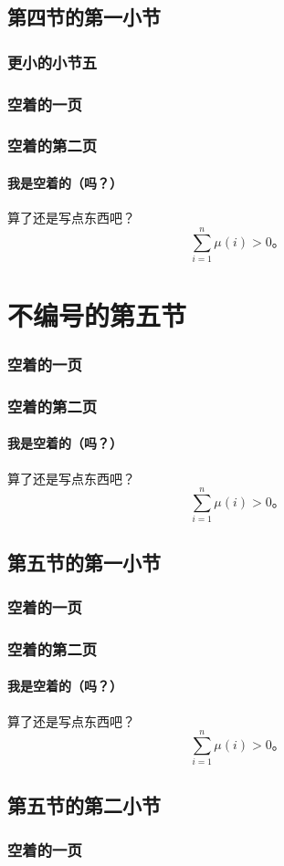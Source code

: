 \documentclass{../pkslide}
\begin{document}
\subsection{第四节的第一小节}
\subsubsection{更小的小节五}

\begin{frame}
  \frametitle{空着的一页}
\end{frame}

\begin{frame}
  \frametitle{空着的第二页}
  \framesubtitle{我是空着的（吗？）}
  算了还是写点东西吧？
  \[ \sum_{i = 1}^{n} \mu(i) > 0 \text{。} \]
\end{frame}

\section*{不编号的第五节}

\begin{frame}
  \frametitle{空着的一页}
\end{frame}

\begin{frame}
  \frametitle{空着的第二页}
  \framesubtitle{我是空着的（吗？）}
  算了还是写点东西吧？
  \[ \sum_{i = 1}^{n} \mu(i) > 0 \text{。} \]
\end{frame}

\subsection{第五节的第一小节}

\begin{frame}
  \frametitle{空着的一页}
\end{frame}

\begin{frame}
  \frametitle{空着的第二页}
  \framesubtitle{我是空着的（吗？）}
  算了还是写点东西吧？
  \[ \sum_{i = 1}^{n} \mu(i) > 0 \text{。} \]
\end{frame}

\subsection{第五节的第二小节}

\begin{frame}
  \frametitle{空着的一页}
\end{frame}
\end{document}
